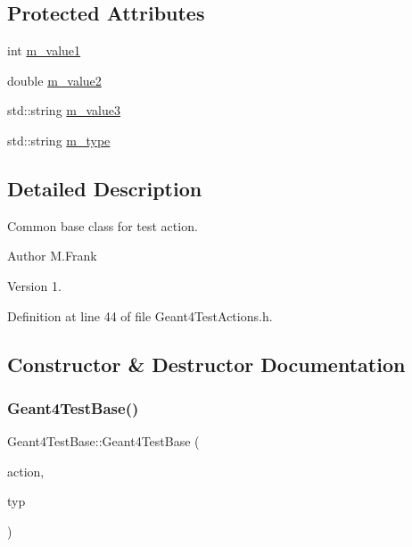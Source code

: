 \subsection*{Protected Attributes}
\begin{DoxyCompactItemize}
\item 
int \hyperlink{class_d_d4hep_1_1_simulation_1_1_test_1_1_geant4_test_base_ae953f3bd81b4ee602820d75dd39ddceb}{m\+\_\+value1}
\item 
double \hyperlink{class_d_d4hep_1_1_simulation_1_1_test_1_1_geant4_test_base_a782a7fd9a4c6920190976bfc7220c53e}{m\+\_\+value2}
\item 
std\+::string \hyperlink{class_d_d4hep_1_1_simulation_1_1_test_1_1_geant4_test_base_a47f59388ee7476f251564abf651de4b5}{m\+\_\+value3}
\item 
std\+::string \hyperlink{class_d_d4hep_1_1_simulation_1_1_test_1_1_geant4_test_base_aadfad14d5fb2fa03ca24c8ed07ec190d}{m\+\_\+type}
\end{DoxyCompactItemize}


\subsection{Detailed Description}
Common base class for test action. 

\begin{DoxyAuthor}{Author}
M.\+Frank 
\end{DoxyAuthor}
\begin{DoxyVersion}{Version}
1. 
\end{DoxyVersion}


Definition at line 44 of file Geant4\+Test\+Actions.\+h.



\subsection{Constructor \& Destructor Documentation}
\hypertarget{class_d_d4hep_1_1_simulation_1_1_test_1_1_geant4_test_base_aa66e1731de4829c114fd6fd8452a795b}{}\label{class_d_d4hep_1_1_simulation_1_1_test_1_1_geant4_test_base_aa66e1731de4829c114fd6fd8452a795b} 
\subsubsection{\texorpdfstring{Geant4\+Test\+Base()}{Geant4TestBase()}}
{\footnotesize\ttfamily Geant4\+Test\+Base\+::\+Geant4\+Test\+Base (\begin{DoxyParamCaption}\item[{\hyperlink{class_d_d4hep_1_1_simulation_1_1_geant4_action}{Geant4\+Action} $\ast$}]{action,  }\item[{const std\+::string \&}]{typ }\end{DoxyParamCaption})}



